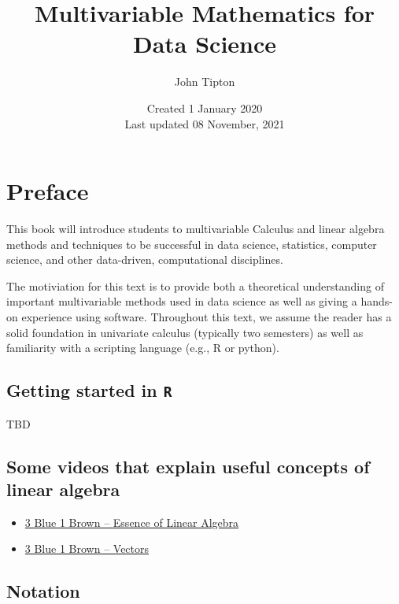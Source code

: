 \documentclass[
]{book}
\title{Multivariable Mathematics for Data Science}
\author{John Tipton}
\date{Created 1 January 2020\\
Last updated 08 November, 2021}
\theoremstyle{definition}
\theoremstyle{definition}
\theoremstyle{definition}
\theoremstyle{definition}
\theoremstyle{remark}
\begin{document}
\maketitle

{
\setcounter{tocdepth}{1}
\tableofcontents
}
\hypertarget{preface}{%
\chapter{Preface}\label{preface}}

This book will introduce students to multivariable Calculus and linear algebra methods and techniques to be successful in data science, statistics, computer science, and other data-driven, computational disciplines.

The motiviation for this text is to provide both a theoretical understanding of important multivariable methods used in data science as well as giving a hands-on experience using software. Throughout this text, we assume the reader has a solid foundation in univariate calculus (typically two semesters) as well as familiarity with a scripting language (e.g., R or python).

\hypertarget{getting-started-in-r}{%
\section{\texorpdfstring{Getting started in \texttt{R}}{Getting started in R}}\label{getting-started-in-r}}

TBD

\hypertarget{some-videos-that-explain-useful-concepts-of-linear-algebra}{%
\section{Some videos that explain useful concepts of linear algebra}\label{some-videos-that-explain-useful-concepts-of-linear-algebra}}

\begin{itemize}
\item
  \href{https://www.3blue1brown.com/lessons/eola-preview}{3 Blue 1 Brown -- Essence of Linear Algebra}
\item
  \href{https://www.3blue1brown.com/lessons/vectors}{3 Blue 1 Brown -- Vectors}
\end{itemize}

\hypertarget{notation}{%
\section{Notation}\label{notation}}
\end{document}
